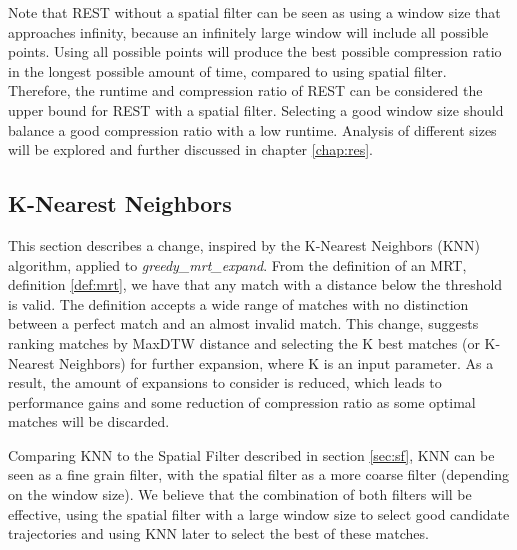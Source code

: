 Note that REST without a spatial filter can be seen as using a window size that approaches infinity, because an infinitely large window will include all possible points. Using all possible points will produce the best possible compression ratio in the longest possible amount of time, compared to using spatial filter. Therefore, the runtime and compression ratio of REST can be considered the upper bound for REST with a spatial filter. Selecting a good window size should balance a good compression ratio with a low runtime. Analysis of different sizes will be explored and further discussed in chapter \ref{chap:res}.



\subsection{K-Nearest Neighbors}
This section describes a change, inspired by the K-Nearest Neighbors (KNN) algorithm, applied to \textit{greedy\_mrt\_expand}. From the definition of an MRT, definition \ref{def:mrt}, we have that any match with a distance below the threshold is valid. The definition accepts a wide range of matches with no distinction between a perfect match and an almost invalid match. This change, suggests ranking matches by MaxDTW distance and selecting the K best matches (or K-Nearest Neighbors) for further expansion, where K is an input parameter. As a result, the amount of expansions to consider is reduced, which leads to performance gains and some reduction of compression ratio as some optimal matches will be discarded.

Comparing KNN to the Spatial Filter described in section \ref{sec:sf}, KNN can be seen as a fine grain filter, with the spatial filter as a more coarse filter (depending on the window size). We believe that the combination of both filters will be effective, using the spatial filter with a large window size to select good candidate trajectories and using KNN later to select the best of these matches.

